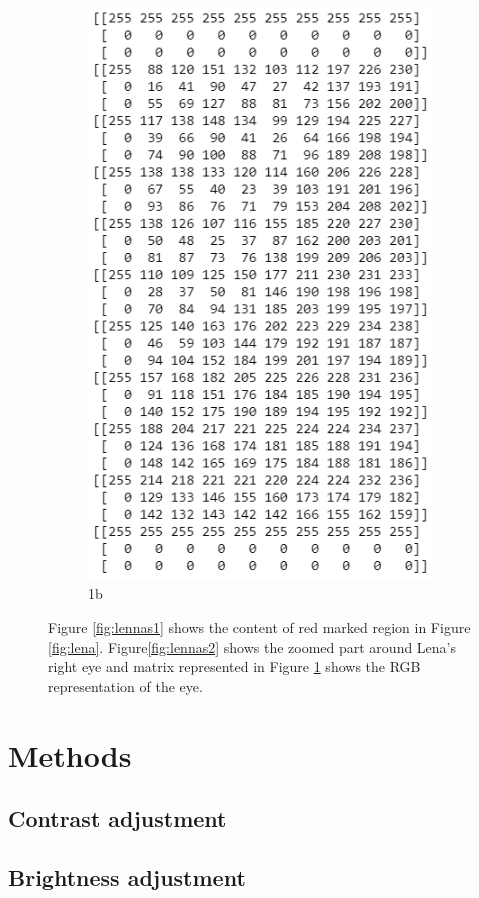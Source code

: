 \documentclass[pdftex,12pt,a4paper]{report}
\begin{document}
\begin{figure}[H]
\begin{subfigure}{.5\textwidth}
  \includegraphics[width=.8\linewidth]{images/lenna_rbg}
  \caption{1b}
  \label{fig:lennas3}
\end{subfigure}
\caption{Figure \ref{fig:lennas1} shows the content of red marked region in Figure \ref{fig:lena}. Figure\ref{fig:lennas2} shows the zoomed part around Lena's right eye and matrix represented in Figure \ref{fig:lennas3} shows the RGB representation of the eye.}
\label{fig:lennas}
\end{figure}

\section{Methods}

\subsection{Contrast adjustment}

\subsection{Brightness adjustment}
\end{document}
